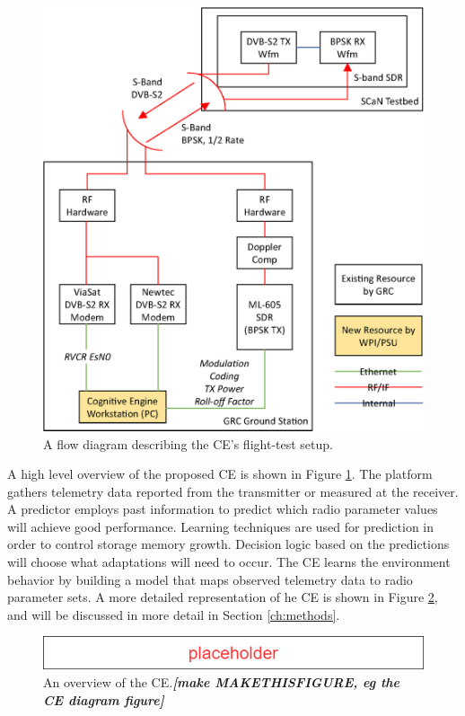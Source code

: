 	\begin{figure}
		\centering
		\caption{A flow diagram describing the CE's flight-test setup.}
		\label{fig:CE_outline}
		\includegraphics[scale=0.5]{figures/system_block_diagram.eps}
	\end{figure}
	
	\par A high level overview of the proposed CE is shown in Figure \ref{fig:CE_outline}. The platform gathers telemetry data reported from the transmitter or measured at the receiver. A predictor employs past information to predict which radio parameter values will achieve good performance. Learning techniques are used for prediction in order to control storage memory growth. Decision logic based on the predictions will choose what adaptations will need to occur. The CE learns the environment behavior by building a model that maps observed telemetry data to radio parameter sets. A more detailed representation of he CE is shown in Figure \ref{bg:CEFigure}, and will be discussed in more detail in Section \ref{ch:methods}.
	\begin{figure}
		\centering
		\caption{An overview of the CE.\textit{\textbf{[make MAKETHISFIGURE, eg the CE diagram figure]}}}
		\label{bg:CEFigure}
		\includegraphics[scale=0.5]{figures/Placeholder.png}
	\end{figure}

